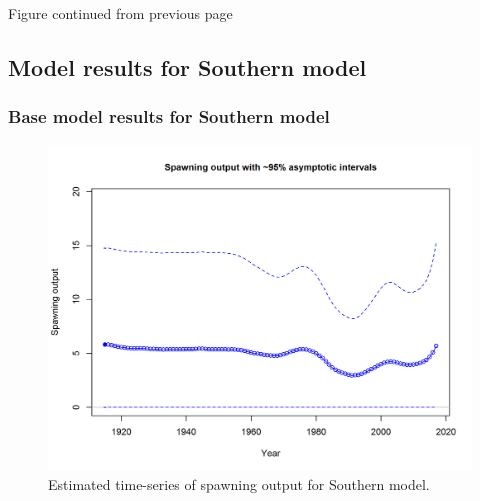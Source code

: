 \documentclass[12pt,]{article}
\begin{document}
\begin{center} 

            Figure continued from previous page 

            \end{center}

\FloatBarrier

\newpage

\subsection{Model results for Southern
model}\label{model-results-for-southern-model}

\subsubsection{Base model results for Southern
model}\label{base-model-results-for-southern-model}

\begin{figure}[htbp]
\centering
\includegraphics{r4ss/plots_mod2/ts7_Spawning_output_with_95_asymptotic_intervals_intervals.png}
\caption{Estimated time-series of spawning output for Southern model.
\label{fig:ssb}}
\end{figure}

\FloatBarrier
\end{document}
